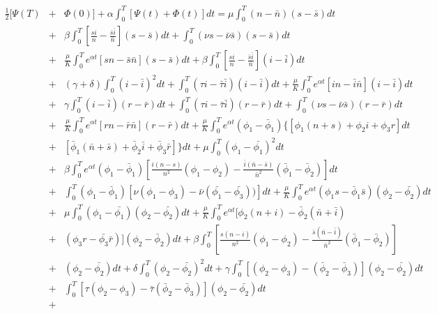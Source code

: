 \begin{eqnarray*}
\frac{1}{2}[\Psi(T)&+&\Phi(0)]+\alpha\int_{0}^{T}[\Psi(t)+\Phi(t)]dt=\mu\int_{0}^{T}(n-\bar{n})(s-\bar{s})dt\\
&+&\beta\int_{0}^{T}\left[\frac{si}{n}-\frac{\bar{s}\bar{i}}{\bar{n}}\right](s-\bar{s})dt+\int_{0}^{T}(\nu s-\bar{\nu}\bar{s})(s-\bar{s})dt\\
&+&\frac{\mu}{K}\int_{0}^{T} e^{\alpha t}\left[sn-\bar{s}\bar{n}\right](s-\bar{s})dt+\beta\int_{0}^{T}\left[\frac{si}{n}-\frac{\bar{s}\bar{i}}{\bar{n}}\right](i-\bar{i})dt\\
&+&(\gamma+\delta)\int_{0}^{T}(i-\bar{i})^2dt+\int_{0}^{T}(\tau i-\bar{\tau}\bar{i})(i-\bar{i})dt+\frac{\mu}{K}\int_{0}^{T} e^{\alpha t}\left[in-\bar{i}\bar{n}\right](i-\bar{i})dt\\
&+&\gamma\int_{0}^{T}(i-\bar{i})(r-\bar{r})dt+\int_{0}^{T}(\tau i-\bar{\tau}\bar{i})(r-\bar{r})dt+\int_{0}^{T}(\nu s-\bar{\nu}\bar{s})(r-\bar{r})dt\\
&+&\frac{\mu}{K}\int_{0}^{T} e^{\alpha t}\left[rn-\bar{r}\bar{n}\right](r-\bar{r})dt+\frac{\mu}{K}\int_{0}^{T}e^{\alpha t}(\phi_1-\bar{\phi}_1)\{[\phi_1(n+s)+\phi_2 i +\phi_3 r]dt\\
&+&[\bar{\phi}_1(\bar{n}+\bar{s})+\bar{\phi}_2 \bar{i} +\bar{\phi}_3 \bar{r}]\}dt+\mu\int_{0}^{T}(\phi_1-\bar{\phi_1})^2dt\\
&+&\beta\int_{0}^{T}e^{\alpha t}(\phi_1-\bar{\phi}_1)\left[\frac{i(n-s)}{n^2}(\phi_1-\phi_2)-\frac{\bar{i}(\bar{n}-\bar{s})}{\bar{n}^2}(\bar{\phi}_1-\bar{\phi}_2)\right]dt\\
&+&\int_{0}^{T} (\phi_1-\bar{\phi}_1)[\nu(\phi_1-\phi_3)-\bar{\nu}(\bar{\phi_1}-\bar{\phi_3}))]dt+\frac{\mu}{K}\int_{0}^{T}e^{\alpha t}(\phi_1s-\bar{\phi}_1\bar{s})(\phi_2-\bar{\phi_2})dt\\
&+&\mu\int_{0}^{T}(\phi_1-\bar{\phi_1})(\phi_2-\bar{\phi_2})dt+\frac{\mu}{K}\int_{0}^{T}e^{\alpha t}[\phi_2(n+i)-\bar{\phi}_2(\bar{n}+\bar{i}) \nonumber\\
&+& (\phi_3 r-\bar{\phi_3}\bar{r})](\phi_2-\bar{\phi}_2)dt+\beta\int_{0}^{T}\left[\frac{s(n-i)}{n^2}(\phi_1-\phi_2)-\frac{\bar{s}(\bar{n}-\bar{i})}{\bar{n}^2}(\bar{\phi}_1-\bar{\phi}_2)\right] \nonumber\\
&+&(\phi_2-\bar{\phi_2})dt+\delta\int_{0}^{T}(\phi_2-\bar{\phi_2})^2dt +\gamma\int_{0}^{T}[(\phi_2-\phi_3)-(\bar{\phi}_2-\bar{\phi}_3)](\phi_2-\bar{\phi_2})dt \nonumber\\
&+&\int_{0}^{T}[\tau(\phi_2-\phi_3)-\bar{\tau}(\bar{\phi}_2-\bar{\phi}_3)](\phi_2-\bar{\phi_2})dt\\&+&

\end{eqnarray*}
